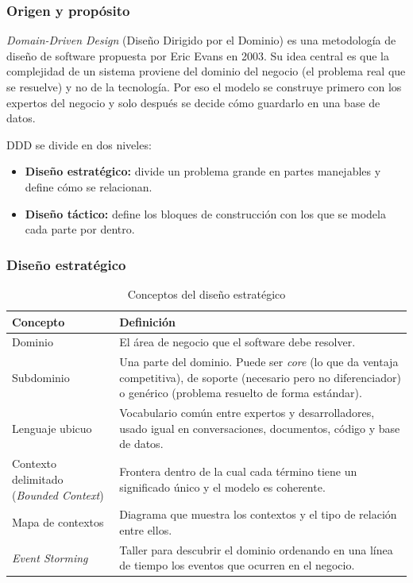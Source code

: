 \documentclass[11pt,a4paper]{article}
\begin{document}
	\subsubsection{Origen y propósito}
	\textit{Domain-Driven Design} (Diseño Dirigido por el Dominio) es una metodología de diseño de software propuesta por Eric Evans en 2003. Su idea central es que la complejidad de un sistema proviene del dominio del negocio (el problema real que se resuelve) y no de la tecnología. Por eso el modelo se construye primero con los expertos del negocio y solo después se decide cómo guardarlo en una base de datos.
	
	DDD se divide en dos niveles:
	\begin{itemize}[leftmargin=2em]
		\item \textbf{Diseño estratégico:} divide un problema grande en partes manejables y define cómo se relacionan.
		\item \textbf{Diseño táctico:} define los bloques de construcción con los que se modela cada parte por dentro.
	\end{itemize}
	
	\subsubsection{Diseño estratégico}
	\begin{table}[H]
		\centering
		\caption{Conceptos del diseño estratégico}
		\small
		\begin{tabularx}{\textwidth}{>{\raggedright\arraybackslash}p{4.2cm}Y}
			\toprule
			\textbf{Concepto} & \textbf{Definición} \\
			\midrule
			Dominio & El área de negocio que el software debe resolver. \\
			Subdominio & Una parte del dominio. Puede ser \textit{core} (lo que da ventaja competitiva), de soporte (necesario pero no diferenciador) o genérico (problema resuelto de forma estándar). \\
			Lenguaje ubicuo & Vocabulario común entre expertos y desarrolladores, usado igual en conversaciones, documentos, código y base de datos. \\
			Contexto delimitado (\textit{Bounded Context}) & Frontera dentro de la cual cada término tiene un significado único y el modelo es coherente. \\
			Mapa de contextos & Diagrama que muestra los contextos y el tipo de relación entre ellos. \\
			\textit{Event Storming} & Taller para descubrir el dominio ordenando en una línea de tiempo los eventos que ocurren en el negocio. \\
			\bottomrule
		\end{tabularx}
	\end{table}
	
\end{document}
